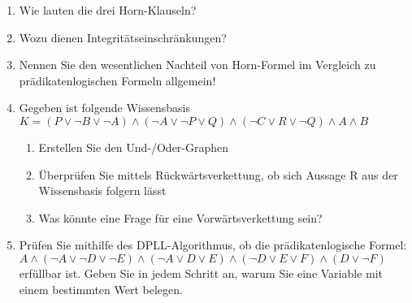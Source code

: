 \begin{enumerate}
	\item Wie lauten die drei Horn-Klauseln?
	\item Wozu dienen Integritätseinschränkungen?
	
	\item Nennen Sie den wesentlichen Nachteil von Horn-Formel im Vergleich zu prädikatenlogischen Formeln allgemein!
	
	\item Gegeben ist folgende Wissensbasis $K=(P \vee \neg B \vee \neg A) \wedge (\neg A \vee \neg P \vee Q) \wedge (\neg C \vee R \vee \neg Q) \wedge A \wedge B$
	
	\begin{enumerate}
		\item Erstellen Sie den Und-/Oder-Graphen
		\item Überprüfen Sie mittels Rückwärtsverkettung, ob sich Aussage R aus der Wissensbasis folgern lässt
		\item Was könnte eine Frage für eine Vorwärtsverkettung sein?
	\end{enumerate}
	
	\item Prüfen Sie mithilfe des DPLL-Algorithmus, ob die prädikatenlogische Formel: $A \wedge (\neg A \vee \neg D \vee \neg E) \wedge (\neg A \vee D \vee E) \wedge (\neg D \vee E \vee F) \wedge (D \vee \neg F)$ erfüllbar ist. Geben Sie in jedem Schritt an, warum Sie eine Variable mit einem bestimmten Wert belegen.
\end{enumerate}










